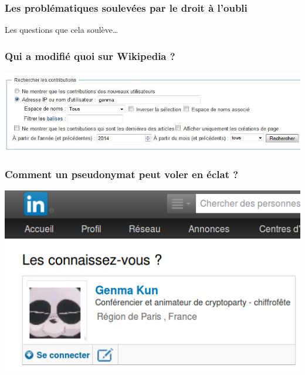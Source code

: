 \documentclass{beamer}
\begin{document}
\begin{frame}
\frametitle{Les problématiques soulevées par le droit à l'oubli}

\begin{block}{Les questions que cela soulève…}
\begin{itemize}
\end{itemize}
\end{block}
\end{frame}

\begin{frame}
\frametitle{Qui a modifié quoi sur Wikipedia ?}
\begin{center}
\includegraphics[scale=0.7] {./images/wikpedia_ip.jpg} 
\end{center}
\end{frame}

\begin{frame}
\frametitle{Comment un pseudonymat peut voler en éclat ?}
\begin{itemize}
\end{itemize}
\end{frame}

\begin{frame}
\begin{center}
\includegraphics[scale=0.7] {./images/attention_cookies_linkedin.png} 
\end{center}
\end{frame}

\end{document}
